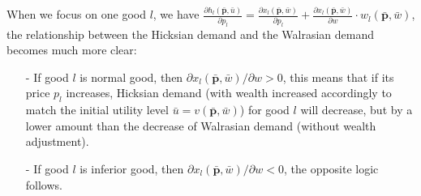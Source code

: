 When we focus on one good $l$, we have $\frac{\partial h_l(\bar{\mathbf{p}},\bar{u})}{\partial p_l} =\frac{\partial x_l(\bar{\mathbf{p}},\bar{w})}{\partial p_l} + \frac{\partial x_l (\bar{\mathbf{p}},\bar{w})}{\partial w}\cdot w_l(\bar{\mathbf{p}},\bar{w})$, the relationship between the Hicksian demand and the Walrasian demand becomes much more clear:
\begin{enumerate}
    \item[-] If good $l$ is normal good, then $\partial x_l (\bar{\mathbf{p}},\bar{w})/\partial w>0$, this means that if its price $p_l$ increases, Hicksian demand (with wealth increased accordingly to match the initial utility level $\bar{u}=v(\bar{\mathbf{p}},\bar{w})$) for good $l$ will decrease, but by a lower amount than the decrease of Walrasian demand (without wealth adjustment).
    \item[-] If good $l$ is inferior good, then $\partial x_l (\bar{\mathbf{p}},\bar{w})/\partial w<0$, the opposite logic follows. 
\end{enumerate}

